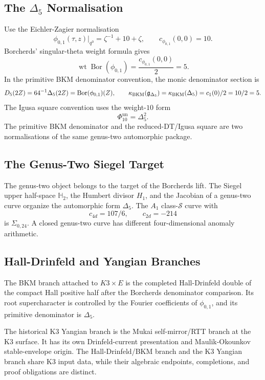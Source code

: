 \subsection*{The \(\Delta_5\) Normalisation}

Use the Eichler-Zagier normalisation
\[
  \phi_{0,1}(\tau,z)\big|_{q^0}
  =
  \zeta^{-1}+10+\zeta,
  \qquad
  c_{\phi_{0,1}}(0,0)=10.
\]
Borcherds' singular-theta weight formula gives
\[
  \operatorname{wt}\operatorname{Bor}(\phi_{0,1})
  =
  \frac{c_{\phi_{0,1}}(0,0)}{2}
  =
  5.
\]
In the primitive BKM denominator convention, the monic denominator
section is
\[
  D_5(2Z)
  =
  64^{-1}\Delta_5(2Z)
  =
  \operatorname{Bor}(\phi_{0,1})(Z),
  \qquad
  \kappa_{\mathrm{BKM}}(\mathfrak g_{\Delta_5})
  =
  \kappa_{\mathrm{BKM}}(\Delta_5)
  =
  c_1(0)/2
  =
  10/2
  =
  5.
\]
The Igusa square convention uses the weight-\(10\) form
\[
  \Phi_{10}^{\mathrm{un}}=\Delta_5^2.
\]
The primitive BKM denominator and the reduced-DT/Igusa square are two
normalisations of the same genus-two automorphic package.

\subsection*{The Genus-Two Siegel Target}

The genus-two object belongs to the target of the Borcherds lift. The
Siegel upper half-space \(\mathbb H_2\), the Humbert divisor \(H_1\),
and the Jacobian of a genus-two curve organize the automorphic form
\(\Delta_5\). The \(A_1\) class-\(\mathcal S\) curve with
\[
  c_{4d}=107/6,\qquad c_{2d}=-214
\]
is \(\Sigma_{0,24}\). A closed genus-two curve has different
four-dimensional anomaly arithmetic.

\subsection*{Hall-Drinfeld and Yangian Branches}

The BKM branch attached to \(K3\times E\) is the completed
Hall-Drinfeld double of the compact Hall positive half after the
Borcherds denominator comparison. Its root supercharacter is controlled
by the Fourier coefficients of \(\phi_{0,1}\), and its primitive
denominator is \(\Delta_5\).

The historical K3 Yangian branch is the Mukai self-mirror/RTT branch
at the K3 surface. It has its own Drinfeld-current presentation and
Maulik-Okounkov stable-envelope origin. The Hall-Drinfeld/BKM branch
and the K3 Yangian branch share K3 input data, while their algebraic
endpoints, completions, and proof obligations are distinct.

